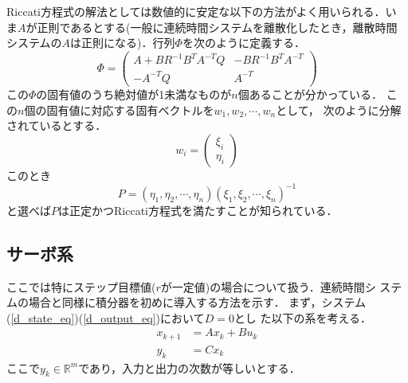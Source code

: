 Riccati方程式の解法としては数値的に安定な以下の方法がよく用いられる．い
ま$A$が正則であるとする(一般に連続時間システムを離散化したとき，離散時間
システムの$A$は正則になる)．行列$\Phi$を次のように定義する．
\begin{equation}
 \Phi =
  \left(\begin{array}{cc}
         A + B R^{-1} B^T A^{-T} Q & - B R^{-1} B^T A^{-T}\\
	 - A^{-T} Q                &  A^{-T}
	\end{array}\right)
\end{equation}
この$\Phi$の固有値のうち絶対値が1未満なものが$n$個あることが分かっている．
この$n$個の固有値に対応する固有ベクトルを$w_1, w_2, \cdots, w_n$として，
次のように分解されているとする．
\begin{equation}
 w_i = \left(\begin{array}{c}
	      \xi_i \\
	      \eta_i
	     \end{array}\right)
\end{equation}
このとき
\begin{equation}
 P = (\eta_1, \eta_2,\cdots,\eta_n)(\xi_1,\xi_2,\cdots,\xi_n)^{-1}
\end{equation}
と選べば$P$は正定かつRiccati方程式を満たすことが知られている．
\subsection{サーボ系}
ここでは特にステップ目標値($r$が一定値)の場合について扱う．連続時間シ
ステムの場合と同様に積分器を初めに導入する方法を示す．
まず，システム(\ref{d_state_eq})(\ref{d_output_eq})において$D=0$とし
た以下の系を考える．
\begin{align}
   x_{k+1} &= A x_k + B u_k \label{d_st_proper_state_eq} \\
       y_k &= C x_k
\label{d_st_proper_output_eq}
\end{align}
ここで$y_k \in \mathbb{R}^m$であり，入力と出力の次数が等しいとする．

